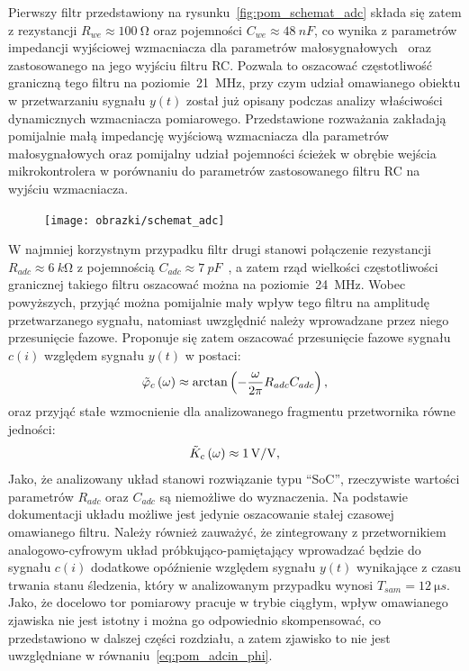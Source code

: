 Pierwszy filtr przedstawiony na rysunku~\ref{fig:pom_schemat_adc} składa się zatem z rezystancji $R_{we} \approx \qty{100}{\ohm}$ oraz pojemności $C_{we} \approx \qty{48}{nF}$, co wynika z parametrów impedancji wyjściowej wzmacniacza dla parametrów małosygnałowych~\cite{microchip_application} oraz zastosowanego na jego wyjściu filtru RC. Pozwala to oszacować częstotliwość graniczną tego filtru na poziomie~\qty{21}{MHz}, przy czym udział omawianego obiektu w przetwarzaniu sygnału $y(t)$ został już opisany podczas analizy właściwości dynamicznych wzmacniacza pomiarowego. Przedstawione rozważania zakładają pomijalnie małą impedancję wyjściową wzmacniacza dla parametrów małosygnałowych oraz pomijalny udział pojemności ścieżek w obrębie wejścia mikrokontrolera w porównaniu do parametrów zastosowanego filtru RC na wyjściu wzmacniacza.

\begin{figure}[htb!]
\begin{center}
\texttt{[image: obrazki/schemat\_adc]}
\end{center}
\end{figure}

W najmniej korzystnym przypadku filtr drugi stanowi połączenie rezystancji $R_{adc} \approx \qty{6}{k \ohm}$ z pojemnością $C_{adc} \approx \qty{7}{pF}$~\cite{stm_f411}, a zatem rząd wielkości częstotliwości granicznej takiego filtru oszacować można na poziomie~\qty{24}{MHz}. Wobec powyższych, przyjąć można pomijalnie mały wpływ tego filtru na amplitudę przetwarzanego sygnału, natomiast uwzględnić należy wprowadzane przez niego przesunięcie fazowe. Proponuje się zatem oszacować przesunięcie fazowe sygnału $c(i)$ względem sygnału $y(t)$ w postaci:
\begin{equation}
\tilde{\varphi}_{c} \left(\omega\right) \approx \arctan \left(-\frac{\omega}{2\pi} R_{adc} C_{adc}\right) \label{eq:pom_adcin_phi},
\end{equation}
oraz przyjąć stałe wzmocnienie dla analizowanego fragmentu przetwornika równe jedności:
\begin{equation}
\tilde{K}_{c} \left(\omega\right) \approx \qty{1}{V \per V} \label{eq:pom_adcin_amp},
\end{equation}
Jako, że analizowany układ stanowi rozwiązanie typu \enquote{SoC}, rzeczywiste wartości parametrów $R_{adc}$ oraz $C_{adc}$ są niemożliwe do wyznaczenia. Na podstawie dokumentacji układu możliwe jest jedynie oszacowanie stałej czasowej omawianego filtru. Należy również zauważyć, że zintegrowany z przetwornikiem analogowo-cyfrowym układ próbkująco-pamiętający wprowadzać będzie do sygnału $c(i)$ dodatkowe opóźnienie względem sygnału $y(t)$ wynikające z czasu trwania stanu śledzenia, który w analizowanym przypadku wynosi $T_{sam} = \qty{12}{\micro s}$. Jako, że docelowo tor pomiarowy pracuje w trybie ciągłym, wpływ omawianego zjawiska nie jest istotny i można go odpowiednio skompensować, co przedstawiono w dalszej części rozdziału, a zatem zjawisko to nie jest uwzględniane w równaniu~\eqref{eq:pom_adcin_phi}.

